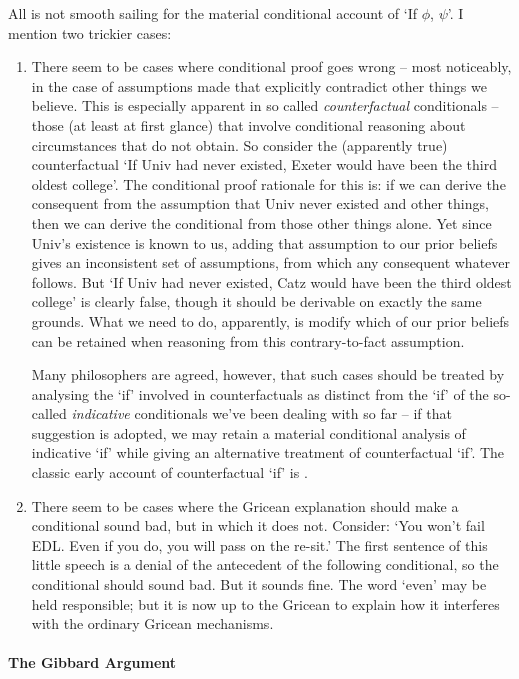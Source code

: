 All is not smooth sailing for the material conditional account of `If $\phi$, $\psi$'. I mention two trickier cases: \begin{enumerate}
	\item There seem to be cases where conditional proof goes wrong – most noticeably, in the case of assumptions made that explicitly contradict other things we believe. This is especially apparent in so called \emph{counterfactual} conditionals – those (at least at first glance) that involve conditional reasoning about circumstances that do not obtain. So consider the (apparently true) counterfactual `If Univ had never existed, Exeter would have been the third oldest college'. The conditional proof rationale for this is: if we can derive the consequent from the assumption that Univ never existed and other things, then we can derive the conditional from those other things alone. Yet since Univ's existence is known to us, adding that assumption to our prior beliefs gives an inconsistent set of assumptions, from which any consequent whatever follows. But `If Univ had never existed, Catz would have been the third oldest college' is clearly false, though it should be derivable on exactly the same grounds. What we need to do, apparently, is modify which of our prior beliefs can be retained when reasoning from this contrary-to-fact assumption.

	 Many philosophers are agreed, however, that such cases should be treated by analysing the `if' involved in counterfactuals as distinct from the `if' of the so-called \emph{indicative} conditionals we've been dealing with so far – if that suggestion is adopted, we may retain a material conditional analysis of indicative `if' while giving an alternative treatment of counterfactual `if'. The classic early account of counterfactual `if' is \citet{lewcount}.
\item There seem to be cases where the Gricean explanation should make a conditional sound bad, but in which it does not. Consider: `You won't fail EDL. Even if you do, you will pass on the re-sit.' The first sentence of this little speech is a denial of the antecedent of the following conditional, so the conditional should sound bad. But it sounds fine. The word `even' may be held responsible; but it is now up to the Gricean to explain how it interferes with the ordinary Gricean mechanisms.
\end{enumerate}

\paragraph{The Gibbard Argument}

